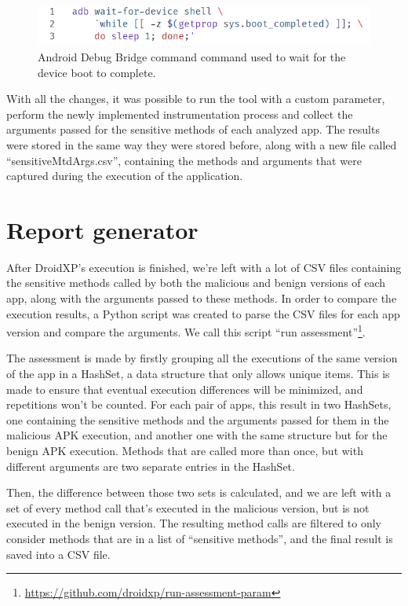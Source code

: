 \begin{figure}
    \centering
    \includegraphics{img/adb-wait-device.png}
    \caption{Android Debug Bridge command command used to wait for the device boot to complete.}
    \label{lst:droidxp-wait-boot-complete}
\end{figure}

With all the changes, it was possible to run the tool with a custom parameter, perform the newly implemented instrumentation process and collect the arguments passed for the sensitive methods of each analyzed app. The results were stored in the same way they were stored before, along with a new file called ``sensitiveMtdArgs.csv'', containing the methods and arguments that were captured during the execution of the application.

\section{Report generator}

After DroidXP's execution is finished, we're left with a lot of CSV files containing the sensitive methods called by both the malicious and benign versions of each app, along with the arguments passed to these methods. In order to compare the execution results, a Python script was created to parse the CSV files for each app version and compare the arguments. We call this script ``run assessment''\footnote{\url{https://github.com/droidxp/run-assessment-param}}.

The assessment is made by firstly grouping all the executions of the same version of the app in a HashSet, a data structure that only allows unique items. This is made to ensure that eventual execution differences will be minimized, and repetitions won't be counted. For each pair of apps, this result in two HashSets, one containing the sensitive methods and the arguments passed for them in the malicious APK execution, and another one with the same structure but for the benign APK execution. Methods that are called more than once, but with different arguments are two separate entries in the HashSet.

Then, the difference between those two sets is calculated, and we are left with a set of every method call that's executed in the malicious version, but is not executed in the benign version. The resulting method calls are filtered to only consider methods that are in a list of ``sensitive methods'', and the final result is saved into a CSV file. 